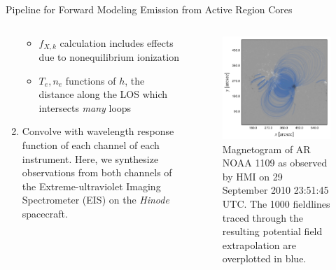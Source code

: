 \documentclass[final]{beamer}
\begin{document}
\begin{frame}
\begin{columns}[T]
\begin{column}{0.49\linewidth}
\begin{block}{Pipeline for Forward Modeling Emission from Active Region Cores}
\begin{columns}[T]
\begin{column}{0.59\columnwidth}
\begin{enumerate}
\begin{itemize}
            \item $f_{X,k}$ calculation includes effects due to nonequilibrium ionization \citep[e.g.][]{bradshaw_numerical_2009,bradshaw_what_2011}
            \item $T_e,n_e$ functions of $h$, the distance along the LOS which intersects \textit{many} loops
          \end{itemize}
        \item Convolve with wavelength response function of each channel of each instrument. Here, we synthesize observations from both channels of the Extreme-ultraviolet Imaging Spectrometer (EIS) on the \textit{Hinode} spacecraft.
        \end{enumerate}
      \end{column}
      \begin{column}{0.39\columnwidth}
        \begin{figure}
          \includegraphics[width=\columnwidth]{figures/hmi_map_with_lines.pdf}
          \caption{Magnetogram of AR NOAA 1109 as observed by HMI on 29 September 2010 23:51:45 UTC. The 1000 fieldlines traced through the resulting potential field extrapolation are overplotted in blue.}
        \label{fig:hmi_map_with_lines}
        \end{figure}
      \end{column}
      \end{columns}

\end{block}
\end{column}
\end{columns}
\end{frame}
\end{document}
